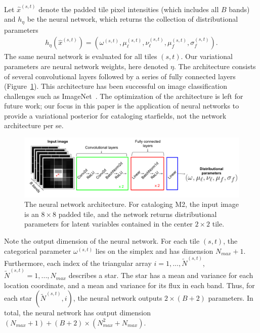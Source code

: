 Let $\hat x^{(s,t)}$ denote the padded tile pixel intensities (which includes all $B$ bands) and $h_\eta$ be the neural network, which returns the collection of distributional parameters
\begin{align}
    h_\eta(\hat x^{(s,t)}) = (\omega^{(s,t)}, \mu_\ell^{(s,t)}, \nu_{\ell}^{(s,t)}, \mu_f^{(s,t)}, \sigma^{(s,t)}_f).
    \label{eq:nn_output}
\end{align}
The same neural network is evaluated for all tiles $(s,t)$. Our variational parameters are neural network weights, here denoted $\eta$. 
The architecture consists of several convolutional layers followed by a series of fully connected layers (Figure~\ref{fig:starnet_arch}). 
This architecture has been successful on image classification challenges such as ImageNet~\cite{imagenet2015}. 
The optimization of the architecture is left for future work; our focus in this paper is the application of neural networks to provide a variational posterior for cataloging starfields, not the network architecture per se. 



\begin{figure}[!tb]
    \centering
    \includegraphics[width=\textwidth]{figures/vi_figures/starnet_archetecture4.png}
    \vspace{-0.5cm}
    \caption{The neural network architecture. For cataloging M2, the input image is an $8\times 8$ padded tile, and the network returns distributional parameters for latent variables contained in the center $2\times 2$ tile.\\
    }
    \label{fig:starnet_arch}
\end{figure}

Note the output dimension of the neural network. For each tile $(s,t)$, the categorical parameter $\omega^{(s,t)}$
lies on the simplex and has dimension $N_{max} + 1$. 
Furthermore, each index of the triangular array
$i = 1, ..., \tilde N^{(s,t)}$, $\tilde N^{(s,t)} = 1, ..., N_{max}$
describes a star. The star has a mean and variance for each location coordinate, and a mean and variance for its flux in each band. 
Thus, for each star $(\tilde N^{(s,t)}, i)$, 
the neural network outputs $2 \times (B + 2)$ parameters. 
In total, the neural network has output dimension $(N_{max} + 1) + (B + 2) \times (N_{max}^2 + N_{max})$. 

